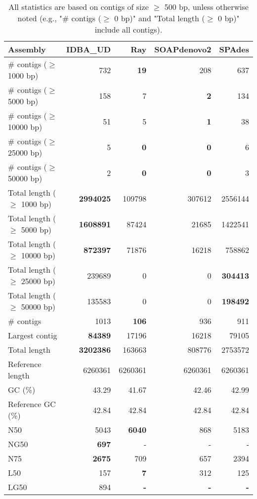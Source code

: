 \documentclass[12pt,a4paper]{article}
\begin{document}
\begin{table}[ht]
\begin{center}
\caption{All statistics are based on contigs of size $\geq$ 500 bp, unless otherwise noted (e.g., "\# contigs ($\geq$ 0 bp)" and "Total length ($\geq$ 0 bp)" include all contigs).}
\begin{tabular}{|l*{4}{|r}|}
\hline
Assembly & IDBA\_UD & Ray & SOAPdenovo2 & SPAdes \\ \hline
\# contigs ($\geq$ 1000 bp) & 732 & {\bf 19} & 208 & 637 \\ \hline
\# contigs ($\geq$ 5000 bp) & 158 & 7 & {\bf 2} & 134 \\ \hline
\# contigs ($\geq$ 10000 bp) & 51 & 5 & {\bf 1} & 38 \\ \hline
\# contigs ($\geq$ 25000 bp) & 5 & {\bf 0} & {\bf 0} & 6 \\ \hline
\# contigs ($\geq$ 50000 bp) & 2 & {\bf 0} & {\bf 0} & 3 \\ \hline
Total length ($\geq$ 1000 bp) & {\bf 2994025} & 109798 & 307612 & 2556144 \\ \hline
Total length ($\geq$ 5000 bp) & {\bf 1608891} & 87424 & 21685 & 1422541 \\ \hline
Total length ($\geq$ 10000 bp) & {\bf 872397} & 71876 & 16218 & 758862 \\ \hline
Total length ($\geq$ 25000 bp) & 239689 & 0 & 0 & {\bf 304413} \\ \hline
Total length ($\geq$ 50000 bp) & 135583 & 0 & 0 & {\bf 198492} \\ \hline
\# contigs & 1013 & {\bf 106} & 936 & 911 \\ \hline
Largest contig & {\bf 84389} & 17196 & 16218 & 79105 \\ \hline
Total length & {\bf 3202386} & 163663 & 808776 & 2753572 \\ \hline
Reference length & 6260361 & 6260361 & 6260361 & 6260361 \\ \hline
GC (\%) & 43.29 & 41.67 & 42.46 & 42.99 \\ \hline
Reference GC (\%) & 42.84 & 42.84 & 42.84 & 42.84 \\ \hline
N50 & 5043 & {\bf 6040} & 868 & 5183 \\ \hline
NG50 & {\bf 697} & - & - & - \\ \hline
N75 & {\bf 2675} & 709 & 657 & 2394 \\ \hline
L50 & 157 & {\bf 7} & 312 & 125 \\ \hline
LG50 & 894 & {\bf -} & {\bf -} & {\bf -} \\ \hline

\end{tabular}
\end{center}
\end{table}
\end{document}
